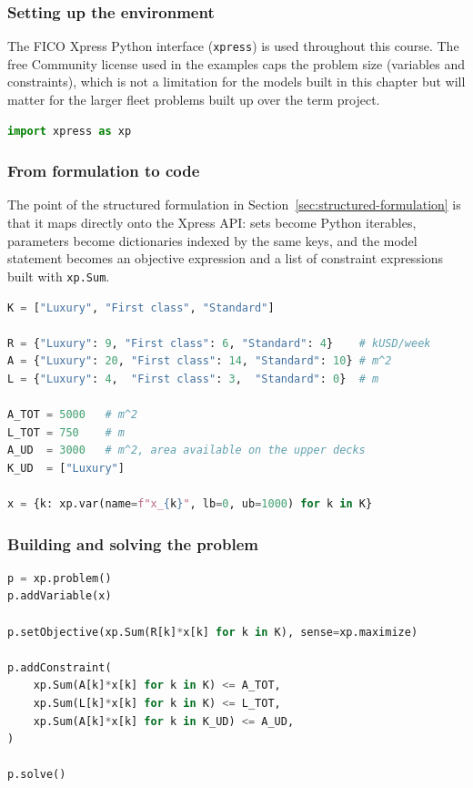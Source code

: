\subsubsection{Setting up the environment}

The FICO Xpress Python interface (\texttt{xpress}) is used throughout this
course. The free Community license used in the examples caps the problem
size (variables and constraints), which is not a limitation for the
models built in this chapter but will matter for the larger fleet
problems built up over the term project.

\begin{lstlisting}[language=Python]
import xpress as xp
\end{lstlisting}

\subsubsection{From formulation to code}

The point of the structured formulation in Section~\ref{sec:structured-formulation}
is that it maps directly onto the Xpress API: sets become Python
iterables, parameters become dictionaries indexed by the same keys, and
the model statement becomes an objective expression and a list of
constraint expressions built with \texttt{xp.Sum}.

\begin{lstlisting}[language=Python]
K = ["Luxury", "First class", "Standard"]

R = {"Luxury": 9, "First class": 6, "Standard": 4}    # kUSD/week
A = {"Luxury": 20, "First class": 14, "Standard": 10} # m^2
L = {"Luxury": 4,  "First class": 3,  "Standard": 0}  # m

A_TOT = 5000   # m^2
L_TOT = 750    # m
A_UD  = 3000   # m^2, area available on the upper decks
K_UD  = ["Luxury"]

x = {k: xp.var(name=f"x_{k}", lb=0, ub=1000) for k in K}
\end{lstlisting}

\subsubsection{Building and solving the problem}

\begin{lstlisting}[language=Python]
p = xp.problem()
p.addVariable(x)

p.setObjective(xp.Sum(R[k]*x[k] for k in K), sense=xp.maximize)

p.addConstraint(
    xp.Sum(A[k]*x[k] for k in K) <= A_TOT,
    xp.Sum(L[k]*x[k] for k in K) <= L_TOT,
    xp.Sum(A[k]*x[k] for k in K_UD) <= A_UD,
)

p.solve()
\end{lstlisting}

